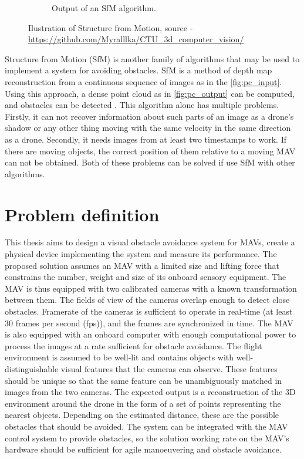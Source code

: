 \begin{figure}[h]
\begin{subfigure}[h]{0.65\textwidth}
      \caption{Output of an SfM algorithm.}
      \label{fig:pc_output}
    \end{subfigure}
    \caption[Ilustration of Structure from Motion.]{Ilustration of Structure from Motion, source - \url{https://github.com/Myralllka/CTU_3d_computer_vision/}}
    \label{fig:pc_recons}
\end{figure}

Structure from Motion (SfM) is another family of algorithms that may be used to implement a system for avoiding obstacles. 
SfM is a method of depth map reconstruction from a continuous sequence of images as in the \autoref{fig:pc_input}.
Using this approach, a dense point cloud as in \autoref{fig:pc_output} can be computed, and obstacles can be detected \cite{Lee2008}. 
This algorithm alone has multiple problems.
Firstly, it can not recover information about such parts of an image as a drone's shadow or any other thing moving with the same velocity in the same direction as a drone.
Secondly, it needs images from at least two timestamps to work.
If there are moving objects, the correct position of them relative to a moving MAV can not be obtained.
Both of these problems can be solved if use SfM with other algorithms.

\section{Problem definition}
\label{sec:problem_definition}
This thesis aims to design a visual obstacle avoidance system for MAVs, create a physical device implementing the system and measure its performance. 
The proposed solution assumes an MAV with a limited size and lifting force that constrains the number, weight and size of its onboard sensory equipment. 
The MAV is thus equipped with two calibrated cameras with a known transformation between them. 
The fields of view of the cameras overlap enough to detect close obstacles.
Framerate of the cameras is sufficient to operate in real-time (at least 30 frames per second (fps)), and the frames are synchronized in time.
The MAV is also equipped with an onboard computer with enough computational power to process the images at a rate sufficient for obstacle avoidance.
The flight environment is assumed to be well-lit and contains objects with well-distinguishable visual features that the cameras can observe.
These features should be unique so that the same feature can be unambiguously matched in images from the two cameras.
The expected output is a reconstruction of the 3D environment around the drone in the form of a set of points representing the nearest objects.
Depending on the estimated distance, these are the possible obstacles that should be avoided.
The system can be integrated with the MAV control system to provide obstacles, so the solution working rate on the MAV's hardware should be sufficient for agile manoeuvering and obstacle avoidance.

